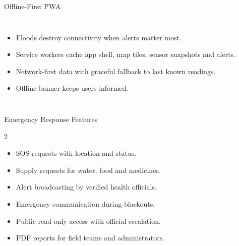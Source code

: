 \documentclass[aspectratio=169,11pt]{beamer}
\begin{document}
\begin{frame}{Offline-First PWA}
\begin{columns}[T]\begin{itemize}\item Floods destroy connectivity when alerts matter most.\item Service workers cache app shell, map tiles, sensor snapshots and alerts.\item Network-first data with graceful fallback to last known readings.\item Offline banner keeps users informed.\end{itemize}
\centering{}\end{columns}
\end{frame}

\begin{frame}{Emergency Response Features}
\begin{multicols}{2}\begin{itemize}\item SOS requests with location and status.\item Supply requests for water, food and medicines.\item Alert broadcasting by verified health officials.\item Emergency communication during blackouts.\item Public read-only access with official escalation.\item PDF reports for field teams and administrators.\end{itemize}\end{multicols}
\centering{}
\end{frame}
\end{document}
